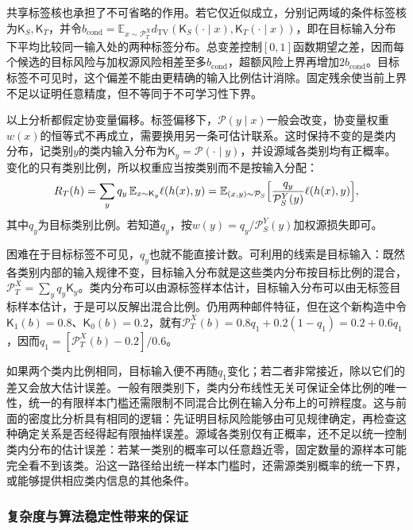 共享标签核也承担了不可省略的作用。若它仅近似成立，分别记两域的条件标签核为$\mathsf K_S,\mathsf K_T$，并令$b_{\mathrm{cond}}=\mathbb E_{x\sim\mathcal P_T^X}d_{\mathrm{TV}}(\mathsf K_S(\cdot\mid x),\mathsf K_T(\cdot\mid x))$，即在目标输入分布下平均比较同一输入处的两种标签分布。总变差控制$[0,1]$函数期望之差，因而每个候选的目标风险与加权源风险相差至多$b_{\mathrm{cond}}$，超额风险上界再增加$2b_{\mathrm{cond}}$。目标标签不可见时，这个偏差不能由更精确的输入比例估计消除。固定残余使当前上界不足以证明任意精度，但不等同于不可学习性下界。

以上分析都假定协变量偏移。标签偏移下，$\mathcal P(y\mid x)$一般会改变，协变量权重$w(x)$的恒等式不再成立，需要换用另一条可估计联系。这时保持不变的是类内分布，记类别$y$的类内输入分布为$\mathsf K_y=\mathcal P(\cdot\mid y)$，并设源域各类别均有正概率。变化的只有类别比例，所以权重应当按类别而不是按输入分配：
\[
 R_T(h)=\sum_y q_y\,\mathbb E_{x\sim\mathsf K_y}\ell(h(x),y)
       =\mathbb E_{(x,y)\sim\mathcal P_S}\Bigl[\frac{q_y}{\mathcal P_S^Y(y)}\ell(h(x),y)\Bigr],
\]
其中$q_y$为目标类别比例。若知道$q_y$，按$w(y)=q_y/\mathcal P_S^Y(y)$加权源损失即可。

困难在于目标标签不可见，$q_y$也就不能直接计数。可利用的线索是目标输入：既然各类别内部的输入规律不变，目标输入分布就是这些类内分布按目标比例的混合，$\mathcal P_T^X=\sum_y q_y\mathsf K_y$。类内分布可以由源标签样本估计，目标输入分布可以由无标签目标样本估计，于是可以反解出混合比例。仍用两种邮件特征，但在这个新构造中令$\mathsf K_1(b)=0.8$、$\mathsf K_0(b)=0.2$，就有$\mathcal P_T^X(b)=0.8q_1+0.2(1-q_1)=0.2+0.6q_1$，因而$q_1=[\mathcal P_T^X(b)-0.2]/0.6$。

如果两个类内比例相同，目标输入便不再随$q_1$变化；若二者非常接近，除以它们的差又会放大估计误差。一般有限类别下，类内分布线性无关可保证全体比例的唯一性，统一的有限样本门槛还需限制不同混合比例在输入分布上的可辨程度。这与前面的密度比分析具有相同的逻辑：先证明目标风险能够由可见规律确定，再检查这种确定关系是否经得起有限抽样误差。源域各类别仅有正概率，还不足以统一控制类内分布的估计误差：若某一类别的概率可以任意趋近零，固定数量的源样本可能完全看不到该类。沿这一路径给出统一样本门槛时，还需源类别概率的统一下界，或能够提供相应类内信息的其他条件。

\subsubsection{复杂度与算法稳定性带来的保证}
\label{sec:transfer-stability}

